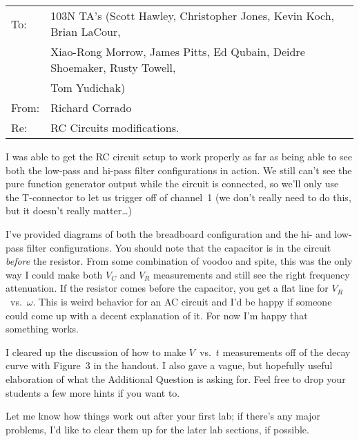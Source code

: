 \documentclass[12pt]{article}
\begin{document}
\pagestyle{empty}

\begin{flushleft}
\begin{tabular}{ll}
To: & 103N TA's (Scott Hawley, Christopher Jones, Kevin Koch, Brian LaCour, \\ 
& Xiao-Rong Morrow, James Pitts, Ed Qubain, Deidre Shoemaker, Rusty Towell, \\
& Tom Yudichak) \\
From: & Richard Corrado \\
Re: & RC Circuits modifications.
\end{tabular}
\end{flushleft}

I was able to get the RC circuit setup to work properly as far as being able
to see both the low-pass and hi-pass filter configurations in action. We still
can't see the pure function generator output while the circuit is connected,
so we'll only use the T-connector to let us trigger off of channel~1 (we don't
really need to do this, but it doesn't really matter\ldots)

I've provided diagrams of both the breadboard configuration and the hi- and
low-pass filter configurations.  You should note that the capacitor is in the
circuit {\it before} the resistor. From some combination of voodoo and spite,
this was the only way I could make both $V_C$ and $V_R$ measurements and still
see the right frequency attenuation.  If the resistor comes before the 
capacitor, you get a flat line for $V_R$~vs.~$\omega$.  This is weird behavior
for an AC circuit and I'd be happy if someone could come up with a decent
explanation of it. For now I'm happy that something works.

I cleared up the discussion of how to make $V$~vs.~$t$ measurements off of the 
decay curve with Figure~3 in the handout. I also gave a vague, but hopefully
useful elaboration of what the Additional Question is asking for.  Feel free
to drop your students a few more hints if you want to.

Let me know how things work out after your first lab; if there's any major 
problems, I'd like to clear them up for the later lab sections, if possible.
\end{document}
